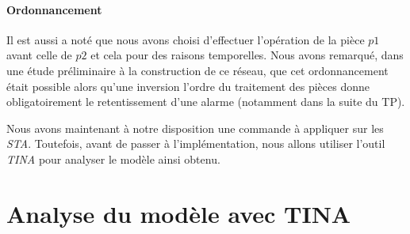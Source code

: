 \paragraph*{Ordonnancement}
Il est aussi a noté que nous avons choisi d'effectuer l'opération de la pièce $p1$ avant celle de $p2$ et cela pour des raisons temporelles. Nous avons remarqué, dans une étude préliminaire à la construction de ce réseau, que cet ordonnancement était possible alors qu'une inversion l'ordre du traitement des pièces donne obligatoirement le retentissement d'une alarme (notamment dans la suite du TP).


Nous avons maintenant à notre disposition une commande à appliquer sur les \emph{STA}. Toutefois, avant de passer à l'implémentation, nous allons utiliser l'outil \emph{TINA} pour analyser le modèle ainsi obtenu.	


\section{Analyse du modèle avec TINA}

